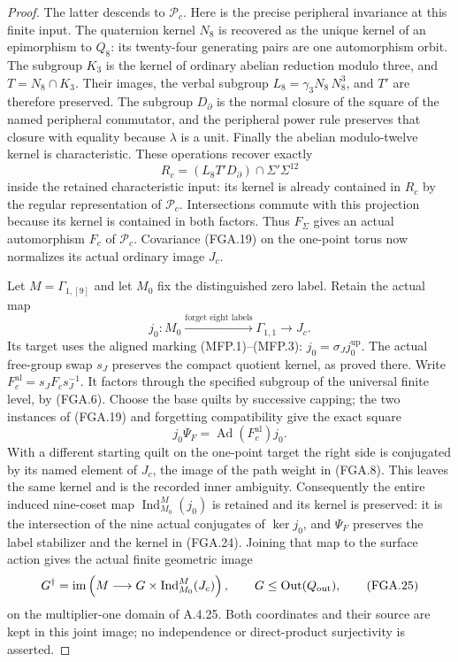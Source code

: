\begin{proof}
The latter descends to $\mathcal P_c$.
Here is the precise peripheral invariance at this
finite input.  The quaternion kernel $N_8$ is
recovered as the unique kernel of an epimorphism
to $Q_8$: its twenty-four generating pairs are
one automorphism orbit.  The subgroup $K_3$ is
the kernel of ordinary abelian reduction modulo
three, and $T=N_8\cap K_3$.  Their images, the
verbal subgroup $L_8=\gamma_3N_8\,N_8^3$, and
$T'$ are therefore preserved.  The subgroup
$D_\partial$ is the normal closure of the square
of the named peripheral commutator, and the
peripheral power rule preserves that closure
with equality because $\lambda$ is a unit.
Finally the abelian modulo-twelve kernel is
characteristic.  These operations recover exactly
\[
 R_c=(L_8T'D_\partial)\cap\Sigma'\Sigma^{12}
                                                               \tag{FGA.22}
\]
inside the retained characteristic input: its
kernel is already contained in $R_c$ by the
regular representation of $\mathcal P_c$.
Intersections commute with this projection
because its kernel is contained in both factors.
Thus $F_\Sigma$ gives an actual automorphism
$F_c$ of $\mathcal P_c$.
Covariance (FGA.19) on the one-point torus now
normalizes its actual ordinary image $J_c$.

Let $M=\Gamma_{1,[9]}$ and let $M_0$ fix the
distinguished zero label.  Retain the actual map
\[
 j_0:M_0\xrightarrow{\text{forget eight labels}}
            \Gamma_{1,1}\longrightarrow J_c.
                                                               \tag{FGA.23}
\]
Its target uses the aligned marking (MFP.1)--(MFP.3):
$j_0=\sigma_Jj_0^{\mathrm{up}}$.  The actual free-group
swap $s_J$ preserves the compact quotient kernel, as
proved there. Write $F_c^{\mathrm{al}}=s_JF_cs_J^{-1}$.
It factors through the specified subgroup of the
universal finite level, by (FGA.6).
Choose the base quilts by successive capping;
the two instances of (FGA.19) and forgetting
compatibility give the exact square
\[
                    j_0\Psi_F=\operatorname{Ad}(F_c^{\mathrm{al}})j_0.
                                                               \tag{FGA.24}
\]
With a different starting quilt on the one-point
target the right side is conjugated by its named
element of $J_c$, the image of the path weight
in (FGA.8).  This leaves the same kernel and is
the recorded inner ambiguity.
Consequently the entire induced nine-coset map
$\operatorname{Ind}_{M_0}^{M}(j_0)$ is retained
and its kernel is preserved: it is the intersection
of the nine actual conjugates of $\ker j_0$,
and $\Psi_F$ preserves the label stabilizer and
the kernel in (FGA.24).
Joining that map to the surface action gives the
actual finite geometric image
\[
 G^\dagger=\operatorname{im}\left(
  M\longrightarrow
  G\times\operatorname{Ind}_{M_0}^{M}(J_c)\right),
 \qquad G\leq\operatorname{Out}(Q_{\rm out}),
                                                               \tag{FGA.25}
\]
on the multiplier-one domain of A.4.25.
Both coordinates and their source are kept in
this joint image; no independence or direct-product
surjectivity is asserted.


\end{proof}
